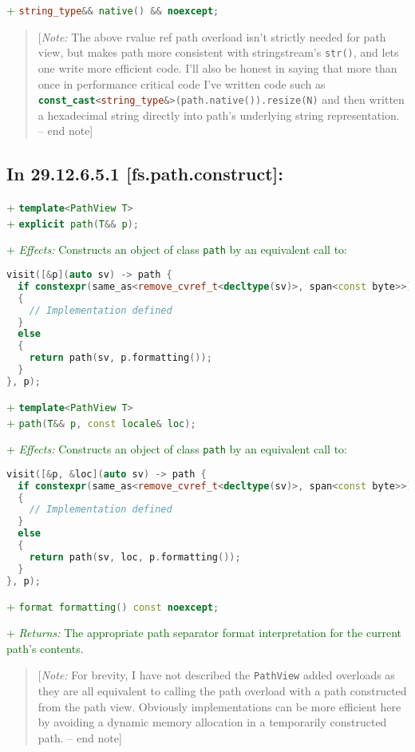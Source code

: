 \documentclass[11pt]{article}
\newcommand{\code}[2][cpp]{\lstinline[language=#1,basicstyle=\small\ttfamily]{#2}}
\newcommand{\desc}[1]{\textit{#1}}
\newcommand{\effects}{\desc{Effects: }}
\newcommand{\returns}{\desc{Returns: }}
\newcommand{\note}[1]{\begin{quote}[\textit{Note:} #1 -- end note]\end{quote}}
\newcommand{\tsref}[2]{\subsection*{In #2 \textbf{[#1]}:}}
\newcommand{\tsreplace}[3]{\textcolor{red}{\sout{#1}}#2\textcolor{darkgreen}{#3}}
\begin{document}
\tsreplace{}{}{+ \code{string_type&& native() && noexcept;}}

\note{The above rvalue ref path overload isn't strictly needed for path view, but makes path more consistent with stringstream's \code{str()}, and lets one write more efficient code. I'll also be honest in saying that more than once in performance critical code I've written code such as \code{const_cast<string_type&>(path.native()).resize(N)} and then written a hexadecimal string directly into path's underlying string representation.}


\tsref{fs.path.construct}{29.12.6.5.1}

\tsreplace{}{}{+ \code{template<PathView T>}}\\
\tsreplace{}{}{+ \code{explicit path(T&& p);}}

\tsreplace{}{}{+ \effects Constructs an object of class \code{path} by an equivalent call to:}
\begin{lstlisting}[language=cpp]
visit([&p](auto sv) -> path {
  if constexpr(same_as<remove_cvref_t<decltype(sv)>, span<const byte>>)
  {
    // Implementation defined
  }
  else
  {
    return path(sv, p.formatting());
  }
}, p);
\end{lstlisting}

\tsreplace{}{}{+ \code{template<PathView T>}}\\
\tsreplace{}{}{+ \code{path(T&& p, const locale& loc);}}

\tsreplace{}{}{+ \effects Constructs an object of class \code{path} by an equivalent call to:}
\begin{lstlisting}[language=cpp]
visit([&p, &loc](auto sv) -> path {
  if constexpr(same_as<remove_cvref_t<decltype(sv)>, span<const byte>>)
  {
    // Implementation defined
  }
  else
  {
    return path(sv, loc, p.formatting());
  }
}, p);
\end{lstlisting}

\tsreplace{}{}{+ \code{format formatting() const noexcept;}}

\tsreplace{}{}{+ \returns The appropriate path separator format interpretation for the current path's contents.}

\note{For brevity, I have not described the \code{PathView} added overloads as they are all equivalent to calling the path overload with a path constructed from the path view. Obviously implementations can be more efficient here by avoiding a dynamic memory allocation in a temporarily constructed path.}

\color{darkgreen}
\end{document}
